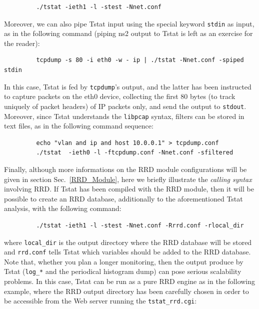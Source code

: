 \documentclass[11pt]{article}
\begin{document}
\begin{small}\begin{verbatim}
         ./tstat -ieth1 -l -stest -Nnet.conf
\end{verbatim}\end{small} \noindent
Moreover, we can also pipe Tstat input using the special keyword
\texttt{stdin} as input, as in the following command (piping ns2 output to 
Tstat is left as an exercise for the reader):

\begin{small}\begin{verbatim}
         tcpdump -s 80 -i eth0 -w - ip | ./tstat -Nnet.conf -spiped stdin
\end{verbatim}\end{small} \noindent
In this case, Tstat is fed by \texttt{tcpdump}'s output, and the latter has been
instructed to capture packets on the eth0 device, collecting the
first 80 bytes (to track uniquely of packet headers) of IP packets only, 
and send the output to \texttt{stdout}. Moreover, since Tstat understands 
the \texttt{libpcap} syntax, filters can be stored in text files, as in 
the following command sequence:

\begin{small}\begin{verbatim}
         echo "vlan and ip and host 10.0.0.1" > tcpdump.conf
         ./tstat  -ieth0 -l -ftcpdump.conf -Nnet.conf -sfiltered
\end{verbatim}\end{small} \noindent
Finally, although more informations on the RRD module configurations will
be given in section Sec.~\ref{RRD_Module}, here we briefly illustrate
the \textit{calling syntax} involving RRD. 
If Tstat has been compiled with the RRD module, then it will
be possible to create an RRD database, additionally to the
aforementioned Tstat analysis, with the following command:

\begin{small}\begin{verbatim}
         ./tstat -ieth1 -l -stest -Nnet.conf -Rrrd.conf -rlocal_dir
\end{verbatim}\end{small} \noindent
where \texttt{local\_dir} is the output directory where the RRD database
will be stored and \texttt{rrd.conf} tells Tstat which variables should
be added to the RRD database.
Note that, whether you plan a longer monitoring, then the output produce by
Tstat (\texttt{log\_*} and the periodical histogram dump) can pose serious scalability
problems. In this case, Tstat can be run as a pure RRD engine as in the
following example, where the RRD output directory has been carefully chosen in
order to be accessible from the Web server running the \texttt{tstat\_rrd.cgi}:
\end{document}
